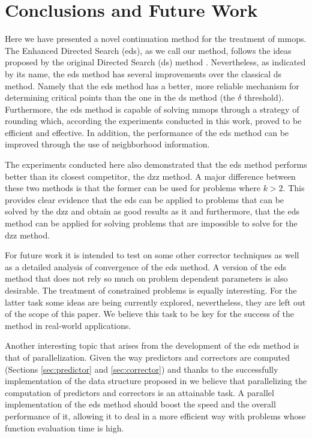 \section{Conclusions and Future Work}
\label{sec:conclusions}

Here we have presented a novel continuation method for the treatment of \glspl{mmop}. The Enhanced Directed Search (\gls{eds}), as we call our method, follows the ideas proposed by the original Directed Search (\gls{ds}) method \cite{directed_search}. Nevertheless, as indicated by its name, the \gls{eds} method has several improvements over the classical \gls{ds} method. Namely that the \gls{eds} method has a better, more reliable mechanism for determining critical points than the one in the \gls{ds} method (the $\delta$ threshold). Furthermore, the \gls{eds} method is capable of solving \glspl{mmop} through a strategy of rounding which, according the experiments conducted in this work, proved to be efficient and effective. In addition, the performance of the \gls{eds} method can be improved through the use of neighborhood information. 

The experiments conducted here also demonstrated that the \gls{eds} method performs better than its closest competitor, the \gls{dzz} method. A major difference between these two methods is that the former can be used for problems where $k > 2$. This provides clear evidence that the \gls{eds} can be applied to problems that can be solved by the \gls{dzz} and obtain as good results as it and furthermore, that the \gls{eds} method can be applied for solving problems that are impossible to solve for the \gls{dzz} method.

For future work it is intended to test on some other corrector techniques as well as a detailed analysis of convergence of the \gls{eds} method. A version of the \gls{eds} method that does not rely so much on problem dependent parameters is also desirable. The treatment of constrained problems is equally interesting. For the latter task some ideas are being currently explored, nevertheless, they are left out of the scope of this paper. We believe this task to be key for the success of the method in real-world applications.

Another interesting topic that arises from the development of the \gls{eds} method is that of parallelization. Given the way predictors and correctors are computed (Sections \ref{sec:predictor} and \ref{sec:corrector}) and thanks to the successfully implementation of the data structure proposed in \cite{pareto_tracer} we believe that parallelizing the computation of predictors and correctors is an attainable task. A parallel implementation of the \gls{eds} method should boost the speed and the overall performance of it, allowing it to deal in a more efficient way with problems whose function evaluation time is high.

